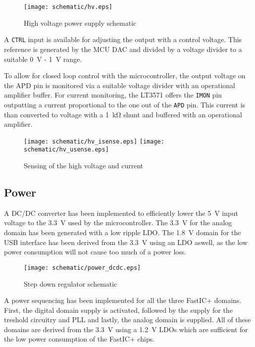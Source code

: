 \FloatBarrier
\begin{figure}[htp!]
    \centering
    \texttt{[image: schematic/hv.eps]}
    \caption{High voltage power supply schematic}
    \label{fig:fastic_triggers}
\end{figure}
\FloatBarrier

A \verb|CTRL| input is available for adjusting the output with a control voltage. This reference is generated by the MCU DAC and divided by a voltage divider to a suitable \SI{0}{V} -  \SI{1}{V} range. 

To allow for closed loop control with the microcontroller, the output voltage on the APD pin is monitored via a suitable voltage divider with an operational amplifier buffer. For current monitoring, the LT3571 offers the \verb|IMON| pin outputting a current proportional to the one out of the \verb|APD| pin. This current is than converted to voltage with a \SI{1}{\kilo\ohm} shunt and buffered with an operational amplifier. 

\FloatBarrier
\begin{figure}[htp!]
    \centering
    \texttt{[image: schematic/hv\_isense.eps]}
    \texttt{[image: schematic/hv\_usense.eps]}
    \caption{Sensing of the high voltage and current}
    \label{fig:fastic_triggers}
\end{figure}
\FloatBarrier

\subsection{Power}
A DC/DC converter has been implemented to efficiently lower the \SI{5}{\volt} input voltage to the \SI{3.3}{\volt} used by the microcontroller. The \SI{3.3}{\volt} for the analog domain has been generated with a low ripple LDO. The \SI{1.8}{\volt} domain for the USB interface has been derived from the \SI{3.3}{\volt} using an LDO aswell, as the low power consumption will not cause too much of a power loss. 

\FloatBarrier
\begin{figure}[htp!]
    \centering
    \texttt{[image: schematic/power\_dcdc.eps]}
    \caption{Step down regulator schematic}
    \label{fig:fastic_triggers}
\end{figure}
\FloatBarrier

A power sequencing has been implemented for all the three FastIC+ domains. First, the digital domain supply is activated, followed by the supply for the treshold circuitry and PLL and lastly, the analog domain is supplied. All of these domains are derived from the \SI{3.3}{\volt} using a \SI{1.2}{\volt} LDOs which are sufficient for the low power consumption of the FastIC+ chips.

